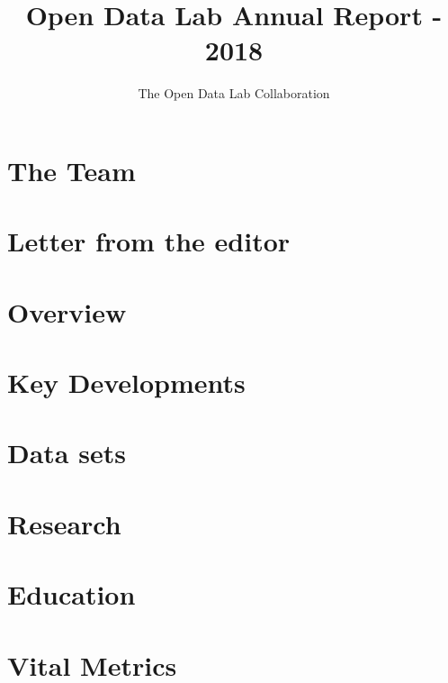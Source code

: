 \documentclass[12pt,letterpaper]{report} %
\title{Open Data Lab Annual Report - 2018}
\author{The Open Data Lab Collaboration}
\begin{document}
\maketitle

\chapter*{The Team}   %

\chapter*{Letter from the editor}   %

\tableofcontents
\pagebreak

\chapter{Overview} 

\chapter{Key Developments} 

\chapter{Data sets} 

\chapter{Research} 

\chapter{Education} 

\chapter{Vital Metrics} 

\end{document}
